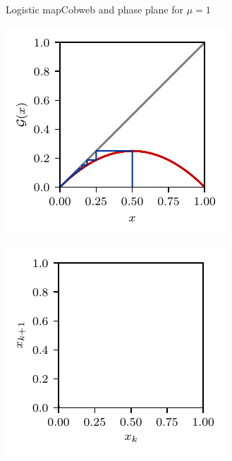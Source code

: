 \documentclass[usenames,dvipsnames,svgnames,10pt,aspectratio=169]{beamer}
\begin{document}
\begin{frame}[t, c]{Logistic map}{Cobweb and phase plane for $\mu = 1$}
	\begin{minipage}{.48\textwidth}
		\centering
		\includegraphics[width=.75\textwidth]{logistic_map_cobweb_plot_0}
	\end{minipage}%
	\begin{minipage}{.48\textwidth}
		\centering
		\includegraphics[width=.75\textwidth]{logistic_map_phase_plane_0}
	\end{minipage}

	\vspace{1cm}
\end{frame}
\end{document}
